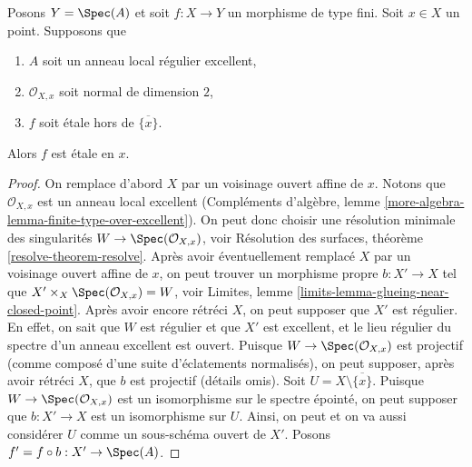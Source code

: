 \begin{lemma}
\label{lemma-key-purity-ramification}
Posons $Y = \Spec(A)$ et soit $f : X \to Y$ un morphisme de type fini.
Soit $x \in X$ un point. Supposons que
\begin{enumerate}
\item $A$ soit un anneau local régulier excellent,
\item $\mathcal{O}_{X, x}$ soit normal de dimension $2$,
\item $f$ soit \'etale hors de $\overline{\{x\}}$.
\end{enumerate}
Alors $f$ est \'etale en $x$.
\end{lemma}

\begin{proof}
On remplace d'abord $X$ par un voisinage ouvert affine de $x$.
Notons que $\mathcal{O}_{X, x}$ est un anneau local excellent
(Compléments d'algèbre, lemme \ref{more-algebra-lemma-finite-type-over-excellent}).
On peut donc choisir une résolution minimale des singularités
$W \to \Spec(\mathcal{O}_{X, x})$, voir
Résolution des surfaces, théorème \ref{resolve-theorem-resolve}.
Après avoir éventuellement remplacé $X$ par un voisinage ouvert affine de $x$,
on peut trouver un morphisme propre $b : X' \to X$ tel que
$X' \times_X \Spec(\mathcal{O}_{X, x}) = W$, voir
Limites, lemme \ref{limits-lemma-glueing-near-closed-point}.
Après avoir encore rétréci $X$, on peut supposer que $X'$ est régulier.
En effet, on sait que $W$ est régulier et que $X'$ est excellent,
et le lieu régulier du spectre d'un anneau excellent est ouvert.
Puisque $W \to \Spec(\mathcal{O}_{X, x})$ est projectif
(comme composé d'une suite d'éclatements normalisés), on peut supposer,
après avoir rétréci $X$, que $b$ est projectif (détails omis).
Soit $U = X \setminus \overline{\{x\}}$.
Puisque $W \to \Spec(\mathcal{O}_{X, x})$ est un isomorphisme sur le
spectre épointé, on peut supposer que $b : X' \to X$ est un isomorphisme sur $U$.
Ainsi, on peut et on va aussi considérer $U$ comme un sous-schéma ouvert de $X'$.
Posons $f' = f \circ b : X' \to \Spec(A)$.


\end{proof}
